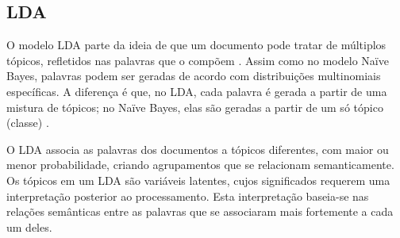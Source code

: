 









\subsection{LDA}
\label{subsection:LDA}


O modelo LDA parte da ideia de que um documento pode tratar de múltiplos tópicos, refletidos nas palavras que o compõem \cite{pnas}. Assim como no modelo Naïve Bayes, palavras podem ser geradas de acordo com distribuições multinomiais específicas. A diferença é que, no LDA, cada palavra é gerada a partir de uma mistura de tópicos; no Naïve Bayes, elas são geradas a partir de um só tópico (classe) \cite{gibbs-lingpipe}.

O LDA associa as palavras dos documentos a tópicos diferentes, com maior ou menor probabilidade, criando agrupamentos que se relacionam semanticamente. Os tópicos em um LDA são variáveis latentes, cujos significados requerem uma interpretação posterior ao processamento. Esta interpretação baseia-se nas relações semânticas entre as palavras que se associaram mais fortemente a cada um deles. %

